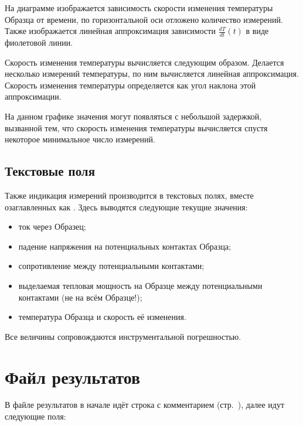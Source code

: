 \documentclass[12pt, a4paper, twocolumn]{report}
\begin{document}
На диаграмме изображается зависимость скорости изменения температуры Образца от времени, по горизонтальной оси отложено количество измерений. Также изображается линейная аппроксимация зависимости $\frac{dT}{dt}(t)$ в виде фиолетовой линии.

Скорость изменения температуры вычисляется следующим образом. Делается несколько измерений температуры, по ним вычисляется линейная аппроксимация. Скорость изменения температуры определяется как угол наклона этой аппроксимации.

На данном графике значения могут появляться с небольшой задержкой, вызванной тем, что скорость изменения температуры вычисляется спустя некоторое минимальное число измерений.

\subsection{Текстовые поля}

Также индикация измерений производится в текстовых полях, вместе озаглавленных как . Здесь выводятся следующие текущие значения:

\begin{itemize}
\item ток через Образец;
\item падение напряжения на потенциальных контактах Образца;
\item сопротивление между потенциальными контактами;
\item выделаемая тепловая мощность на Образце между потенциальными контактами (не на всём Образце!);
\item температура Образца и скорость её изменения.
\end{itemize}

Все величины сопровождаются инструментальной погрешностью.

\section{Файл результатов}

В файле результатов в начале идёт строка с комментарием (стр.~\pageref{sec_dut_comment}), далее идут следующие поля:
\end{document}
